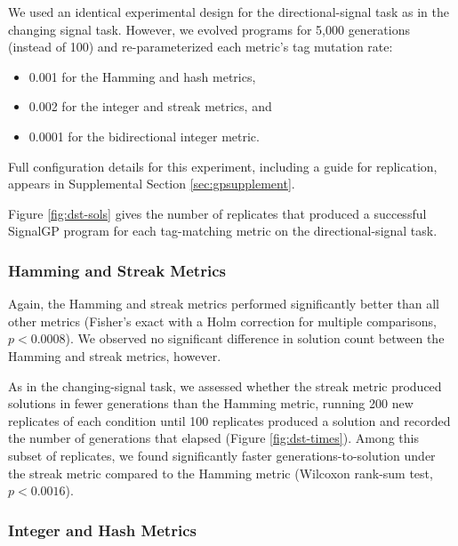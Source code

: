 We used an identical experimental design for the directional-signal task as in the changing signal task.
However, we evolved programs for 5,000 generations (instead of 100) and re-parameterized each metric's tag mutation rate:
\begin{itemize}
\item 0.001 for the Hamming and hash metrics,
\item 0.002 for the integer and streak metrics, and
\item 0.0001 for the bidirectional integer metric.
\end{itemize}
Full configuration details for this experiment, including a guide for replication, appears in Supplemental Section \ref{sec:gpsupplement}.

Figure \ref{fig:dst-sols} gives the number of replicates that produced a successful SignalGP program for each tag-matching metric on the directional-signal task.

\subsubsection{Hamming and Streak Metrics}

Again, the Hamming and streak metrics performed significantly better than all other metrics (Fisher's exact with a Holm correction for multiple comparisons, $p < 0.0008$).
We observed no significant difference in solution count between the Hamming and streak metrics, however.

As in the changing-signal task, we assessed whether the streak metric produced solutions in fewer generations than the Hamming metric, running 200 new replicates of each condition until 100 replicates produced a solution and recorded the number of generations that elapsed (Figure \ref{fig:dst-times}).
Among this subset of replicates, we found significantly faster generations-to-solution under the streak metric compared to the Hamming metric (Wilcoxon rank-sum test, $p < 0.0016$).

\subsubsection{Integer and Hash Metrics}

